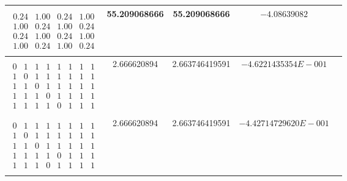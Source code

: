 \begin{center}
\begin{tabular}{|c|c|c|c|c|}
$\begin{smallmatrix}


\ & \ & \ & \   \\


0.24 &1.00 &0.24 &1.00 \\ 1.00 &0.24 &1.00 &0.24 \\


0.24 &1.00 &0.24 &1.00 \\ 1.00 &0.24 &1.00 &0.24 \\


\ & \ & \ & \   


\end{smallmatrix}$ & 55.209068666 & 55.209068666 & $-4.08639082$ \\


\hline




$\begin{smallmatrix}


\ & \ & \ & \ & \ & \ & \ & \ \\


0 &1 &1 &1 &1 &1 &1 &1 \\ 1 &0 &1 &1 &1 &1 &1 &1 \\ 1 &1 &0 &1 &1 &1 &1 &1 \\


1 &1 &1 &0 &1 &1 &1 &1 \\ 1& 1 &1 &1 &0 &1 &1 &1 \\


\ & \ & \ & \ & \ & \ & \ & \ 


\end{smallmatrix}$ & 2.666620894 & 2.663746419591 & $-4.6221435354E-001$ \\


\hline




$\begin{smallmatrix}


\ & \ & \ & \ & \ & \ & \ & \ \\


0 &1 &1 &1 &1 &1 &1 &1 \\ 1 &0 &1 &1 &1 &1 &1 &1 \\ 1 &1 &0 &1 &1 &1 &1 &1\\


1 &1 &1 &1 &0 &1 &1 &1 \\ 1 &1 &1 &0 &1 &1 &1 &1 \\


\ & \ & \ & \ & \ & \ & \ & \ 


\end{smallmatrix}$ & 2.666620894 & 2.663746419591 & $-4.42714729620E-001$\\


\hline


\end{tabular}


\end{center}






